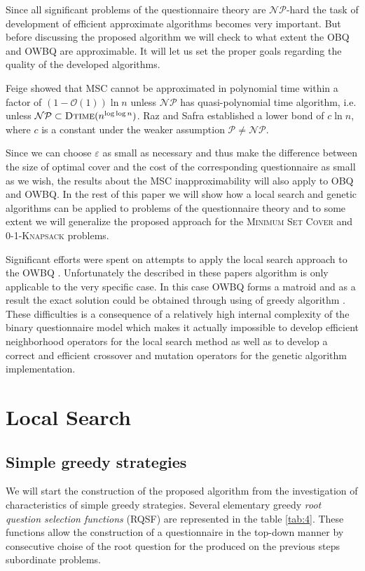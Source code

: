 \documentclass[11pt]{article}
\begin{document}
Since all significant problems of the questionnaire theory are $\mathcal{NP}$-hard the task of development of efficient approximate algorithms becomes very important. But before discussing the proposed algorithm we will check to what extent the OBQ and OWBQ are approximable. It will let us set the proper goals regarding the quality of the developed algorithms.

Feige \cite{F} showed that MSC cannot be approximated in polynomial time within a factor of $(1-\mathcal{O}(1))\ln n$ unless $\mathcal{NP}$ has quasi-polynomial time algorithm, i.e. unless $\mathcal{NP} \subset\textsc{Dtime}(n^{\log\log n})$. Raz and Safra \cite{RS} established a lower bond of $c\ln n$, where $c$ is a constant under the weaker assumption $\mathcal{P}\neq\mathcal{NP}$. 

Since we can choose $\varepsilon$ as small as necessary and thus make the difference between the size of optimal cover and the cost of the corresponding questionnaire as small as we wish, the results about the MSC inapproximability will also apply to OBQ and OWBQ. In the rest of this paper we will show how a local search and genetic algorithms can be applied to problems of the questionnaire theory and to some extent we will generalize the proposed approach for the \textsc{Minimum Set Cover} and \textsc{0-1-Knapsack} problems.

Significant efforts were spent on attempts to apply the local search approach to the OWBQ \cite{ArBo:tpait, ArBo:tpem}. Unfortunately the described in these papers algorithm is only applicable to the very specific case. In this case OWBQ forms a matroid and as a result the exact solution could be obtained through using of greedy algorithm \cite{Bo:tpp}. These difficulties is a consequence of a relatively high internal complexity of the binary questionnaire model which makes it actually impossible to develop efficient neighborhood operators for the local search method as well as to develop a correct and efficient crossover and mutation operators for the genetic algorithm implementation.

%
%
%
%
%
%
%
\section{Local Search}

%
%
%
\subsection{Simple greedy strategies}
We will start the construction of the proposed algorithm from the investigation of characteristics of simple greedy strategies. Several elementary greedy \emph{root question selection functions} (RQSF) are represented in the table \ref{tab:4}. These functions allow the construction of a questionnaire in the top-down manner by consecutive choise of the root question for the produced on the previous steps subordinate problems. 
\end{document}
